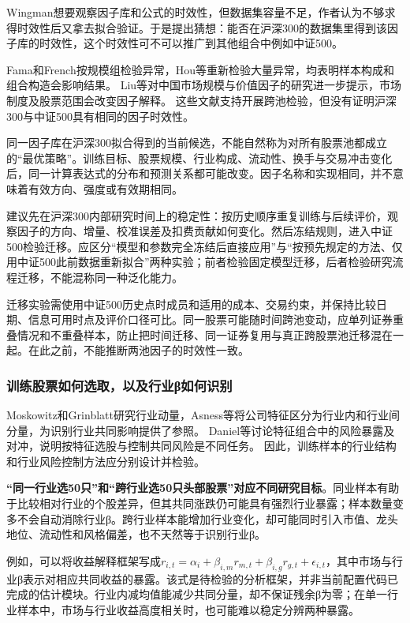 \documentclass[UTF8,12pt,a4paper,fontset=none]{ctexart}
\begin{document}
Wingman想要观察因子库和公式的时效性，但数据集容量不足，作者认为不够求得时效性后又拿去拟合验证。于是提出猜想：能否在沪深300的数据集里得到该因子库的时效性，这个时效性可不可以推广到其他组合中例如中证500。


Fama和French按规模组检验异常，Hou等重新检验大量异常，均表明样本构成和组合构造会影响结果。\cite{r8,r9} Liu等对中国市场规模与价值因子的研究进一步提示，市场制度及股票范围会改变因子解释。\cite{r10} 这些文献支持开展跨池检验，但没有证明沪深300与中证500具有相同的因子时效性。


同一因子库在沪深300拟合得到的当前候选，不能自然称为对所有股票池都成立的“最优策略”。训练目标、股票规模、行业构成、流动性、换手与交易冲击变化后，同一计算表达式的分布和预测关系都可能改变。因子名称和实现相同，并不意味着有效方向、强度或有效期相同。


建议先在沪深300内部研究时间上的稳定性：按历史顺序重复训练与后续评价，观察因子的方向、增量、校准误差及扣费贡献如何变化。然后冻结规则，进入中证500检验迁移。应区分“模型和参数完全冻结后直接应用”与“按预先规定的方法、仅用中证500此前数据重新拟合”两种实验；前者检验固定模型迁移，后者检验研究流程迁移，不能混称同一种泛化能力。


迁移实验需使用中证500历史点时成员和适用的成本、交易约束，并保持比较日期、信息可用时点及评价口径可比。同一股票可能随时间跨池变动，应单列证券重叠情况和不重叠样本，防止把时间迁移、同一证券复用与真正跨股票池迁移混在一起。在此之前，不能推断两池因子的时效性一致。


\subsubsection{训练股票如何选取，以及行业β如何识别}

Moskowitz和Grinblatt研究行业动量，Asness等将公司特征区分为行业内和行业间分量，为识别行业共同影响提供了参照。\cite{r11,r12} Daniel等讨论特征组合中的风险暴露及对冲，说明按特征选股与控制共同风险是不同任务。\cite{r13} 因此，训练样本的行业结构和行业风险控制方法应分别设计并检验。


\textbf{“同一行业选50只”和“跨行业选50只头部股票”对应不同研究目标}。同业样本有助于比较相对行业的个股差异，但其共同涨跌仍可能具有强烈行业暴露；样本数量变多不会自动消除行业β。跨行业样本能增加行业变化，却可能同时引入市值、龙头地位、流动性和风格偏差，也不天然等于识别行业β。


例如，可以将收益解释框架写成$r_{i,t}=\alpha_i+\beta_{i,m}r_{m,t}+\beta_{i,g}r_{g,t}+\epsilon_{i,t}$，其中市场与行业β表示对相应共同收益的暴露。该式是待检验的分析框架，并非当前配置代码已完成的估计模块。行业内减均值能减少共同分量，却不保证残余β为零；在单一行业样本中，市场与行业收益高度相关时，也可能难以稳定分辨两种暴露。
\end{document}
